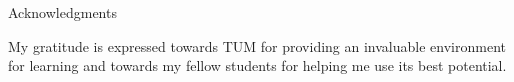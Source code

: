 \thispagestyle{empty}

\vspace*{20mm}

\begin{center}
{ Acknowledgments}
\end{center}

\vspace{10mm}

My gratitude is expressed towards TUM for providing an invaluable environment for learning and towards my fellow students for helping me use its best potential.

\cleardoublepage{}
